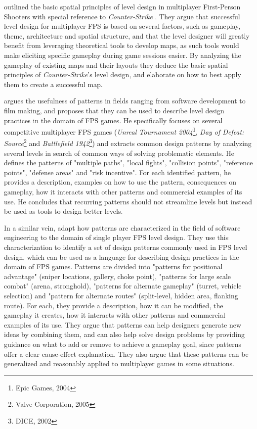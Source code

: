 \documentclass{Configuration_Files/PoliMi3i_thesis}
\begin{document}
 outlined the basic spatial principles of level design in multiplayer First-Person Shooters with special reference to \textit{Counter-Strike} \cite{guttler_spatial_2003}. They argue  that successful level design for multiplayer FPS is based on several factors, such as gameplay, theme, architecture and spatial structure, and that the level designer will greatly benefit from leveraging theoretical tools to develop maps, as such tools would make  eliciting specific gameplay during game sessions easier. By analyzing the gameplay of existing maps and their layouts they deduce the basic spatial principles of \textit{Counter-Strike}'s level design, and elaborate on how to best apply them to create a successful map. 

 argues the usefulness of patterns in fields ranging from software development to film making, and proposes that they can be used to describe level design practices in the domain of FPS games. He specifically focuses on several competitive multiplayer FPS games (\textit{Unreal Tournament 2004}\footnote{Epic Games, 2004}, \textit{Day of Defeat: Source}\footnote{Valve Corporation, 2005} and \textit{Battlefield 1942}\footnote{DICE, 2002}) and extracts common design patterns by analyzing several levels in search of common ways of solving problematic elements. He defines the patterns of "multiple paths", "local fights", "collision points", "reference points", "defense areas" and "risk incentive". For each identified pattern, he provides a description, examples on how to use the pattern, consequences on gameplay, how it interacts with other patterns and commercial examples of its use. He concludes that recurring patterns should not streamline levels but instead be used as tools to design better levels. \cite{larsen_level_2006}

In a similar vein,  adapt how patterns are characterized in the field of software engineering to the domain of single player FPS level design. They use this characterization to identify a set of design patterns commonly used in FPS level design, which can be used as a language for describing design practices in the domain of FPS games. Patterns are divided into "patterns for positional advantage" (sniper locations, gallery, choke point), "patterns for large scale combat" (arena, stronghold), "patterns for alternate gameplay" (turret, vehicle selection) and "pattern for alternate routes" (split-level, hidden area, flanking route). For each, they provide a description, how it can be modified, the gameplay it creates, how it interacts with other patterns and commercial examples of its use. 
They argue that patterns can help designers generate new ideas by combining them, and can also help solve design problems by providing guidance on what to add or remove to achieve a gameplay goal, since patterns offer a clear cause-effect explanation. They also argue that these patterns can be generalized and reasonably applied to multiplayer games in some situations. \cite{hullett_design_2010}
\end{document}
